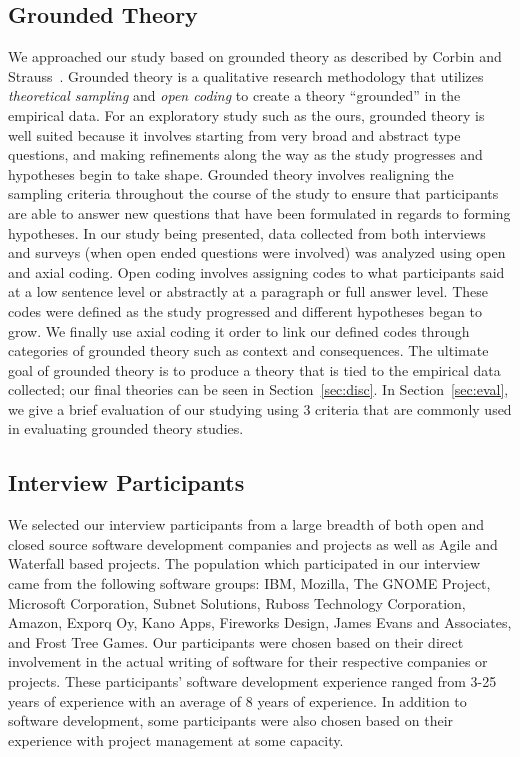 \documentclass[conference]{IEEEtran}
\begin{document}
\subsection{Grounded Theory}
We approached our study based on grounded theory as described by Corbin and Strauss~\cite{Corbin:1998:SP}.
Grounded theory is a qualitative research methodology that utilizes \textit{theoretical sampling} and
\textit{open coding} to create a theory ``grounded'' in the empirical data. For an exploratory study such as
the ours, grounded theory is well suited because it involves starting from very broad and abstract type questions, and
making refinements along the way as the study progresses and hypotheses begin to take shape. Grounded theory involves
realigning the sampling criteria throughout the course of the study to ensure that participants are able to answer new
questions that have been formulated in regards to forming hypotheses. In our study being presented, data collected from
both interviews and surveys (when open ended questions were involved) was analyzed using open and axial coding. Open coding involves
assigning codes to what participants said at a low sentence level or abstractly at a paragraph or full answer level. These
codes were defined as the study progressed and different hypotheses began to grow. We finally use axial coding it order to
link our defined codes through categories of grounded theory such as context and consequences. The ultimate goal of grounded 
theory is to produce a theory that is tied to the empirical data collected; our final theories can be seen in 
Section~\ref{sec:disc}. In Section~\ref{sec:eval}, we give a brief evaluation of our studying using 
3 criteria that are commonly used in evaluating grounded theory studies.

\subsection{Interview Participants}

We selected our interview participants from a large breadth of both open and closed source software development companies
and projects as well as Agile and Waterfall based projects.
The population which participated in our interview came from the following software groups: 
IBM, Mozilla, The GNOME Project, Microsoft Corporation, Subnet Solutions, Ruboss Technology Corporation, 
Amazon, Exporq Oy, Kano Apps, Fireworks Design, James Evans and Associates, and Frost Tree Games. 
Our participants were chosen based on their direct involvement in the actual writing of software for
their respective companies or projects. These participants' software development experience ranged from 3-25 years of experience
with an average of 8 years of experience.
In addition to software development, some participants were also chosen based on their experience with project management
at some capacity.
\end{document}
